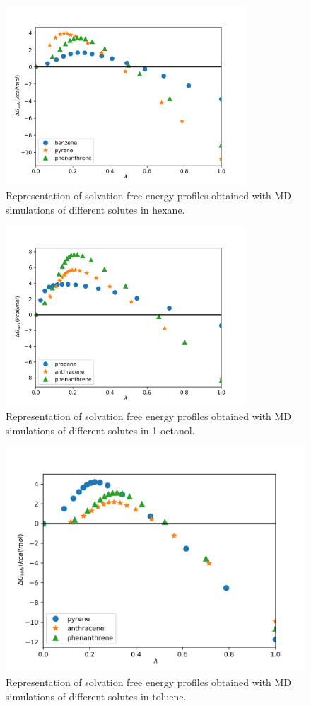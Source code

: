 \begin{figure}[H]
\centering
\includegraphics[width=0.8\textwidth]{Figures/hex}
\caption{Representation of solvation free energy profiles obtained with MD simulations of different solutes in hexane.}
\label{fig:hex}
\end{figure}

\begin{figure}[H]
    \centering
    \includegraphics[width=0.8\textwidth]{Figures/oct}
    \caption{Representation of solvation free energy profiles obtained with MD simulations of different solutes in 1-octanol.}
    \label{fig:oct}
\end{figure}

\begin{figure}[H]
    \centering
    \includegraphics[width=0.8\linewidth]{Figures/tol}
    \caption{Representation of solvation free energy profiles obtained with MD simulations of different solutes in toluene. }
    \label{fig:tol}
\end{figure}

